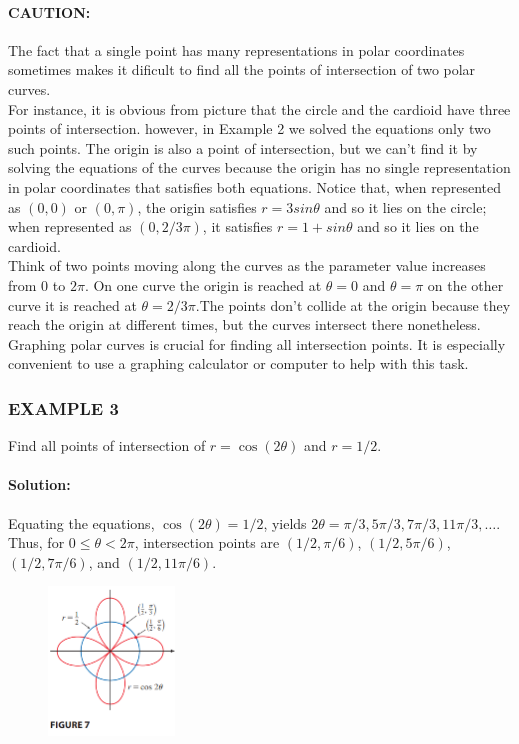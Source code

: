 \documentclass{article}
\begin{document}
\paragraph{CAUTION:} The fact that a single point has many representations in polar coordinates sometimes makes it dificult to find all the points of intersection of two polar curves. 
\\For instance, it is obvious from picture that the circle and the cardioid have three points of intersection. however, in Example 2 we solved the equations only two such points. The origin is also a point of intersection, but we can’t find it by solving the equations of the curves because the origin has no single representation in polar coordinates that satisfies both equations. 
Notice that, when represented as $(0,0)$ or $(0,\pi)$, the origin satisfies $r = 3 sin\theta $ and so it lies on the circle; when represented as $(0,2/3 \pi)$, it satisfies $r=1+sin\theta$ and so it lies on the cardioid. 
\\Think of two points moving along the curves as the parameter value increases from $0$ to $2\pi$. 
On one curve the origin is reached at $\theta=0$ and $\theta=\pi$ on the other curve it is reached at $\theta=2/3 \pi$.The points don’t collide at the origin because they reach the origin at different times, but the curves intersect there nonetheless.
\\Graphing polar curves is crucial for finding all intersection points. It is especially convenient to use a graphing calculator or computer to help with this task.

\subsubsection*{EXAMPLE 3}
Find all points of intersection of $r = \cos(2\theta)$ and $r = 1/2$.

\paragraph{Solution:} Equating the equations, $\cos(2\theta) = 1/2$, yields $2\theta = \pi/3, 5\pi/3, 7\pi/3, 11\pi/3, \dots$. Thus, for $0 \le \theta < 2\pi$, intersection points are $(1/2, \pi/6)$, $(1/2, 5\pi/6)$, $(1/2, 7\pi/6)$, and $(1/2, 11\pi/6)$.
\begin{figure}[htbp]
    \centering
    \includegraphics[width=0.3\textwidth]{graph48.png}
\end{figure}
\end{document}
